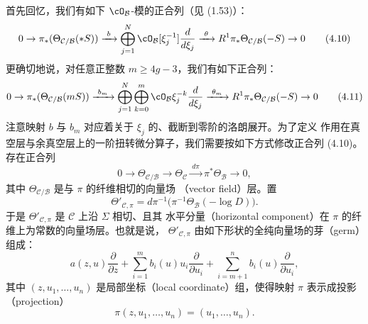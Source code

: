 首先回忆，我们有如下 $\cO_\mathcal{B}$-模的正合列（见 (1.53)）：
\begin{equation}
  0\to\pi_*(\Theta_{\mathcal{C}/\mathcal{B}}(*S))
  \xrightarrow{\ b\ }\bigoplus_{j=1}^N\cO_\mathcal{B}[\xi_j^{-1}]
  \frac{d}{d\xi_j}
  \xrightarrow{\ \theta\ }R^1\pi_*\Theta_{\mathcal{C}/\mathcal{B}}(-S)
  \to 0 \tag{4.10}
\end{equation}
更确切地说，对任意正整数 $m\ge 4g-3$，我们有如下正合列：
\begin{equation}
  0\to\pi_*(\Theta_{\mathcal{C}/\mathcal{B}}(mS))
  \xrightarrow{\ b_m\ }\bigoplus_{j=1}^N\bigoplus_{k=0}^m
  \cO_\mathcal{B}\xi_j^{-k}\frac{d}{d\xi_j}
  \xrightarrow{\ \theta_m\ }R^1\pi_*\Theta_{\mathcal{C}/\mathcal{B}}(-S)
  \to 0 \tag{4.11}
\end{equation}
注意映射 $b$ 与 $b_m$ 对应着关于 $\xi_j$ 的、截断到零阶的洛朗展开。为了定义
作用在真空层与余真空层上的一阶扭转微分算子，我们需要按如下方式修改正合列
(4.10)。
存在正合列
\[
  0\to\Theta_{\mathcal{C}/\mathcal{B}}\to\Theta_\mathcal{C}
  \xrightarrow{\ d\pi\ }\pi^*\Theta_\mathcal{B}\to 0 ,
\]
其中 $\Theta_{\mathcal{C}/\mathcal{B}}$ 是与 $\pi$ 的纤维相切的向量场
（vector field）层。置
\[
  \Theta'_{\mathcal{C},\pi}
  = d\pi^{-1}\bigl(\pi^{-1}\Theta_\mathcal{B}(-\log D)\bigr) .
\]
于是 $\Theta'_{\mathcal{C},\pi}$ 是 $\mathcal{C}$ 上沿 $\Sigma$ 相切、且其
水平分量（horizontal component）在 $\pi$ 的纤维上为常数的向量场层。也就是说，
$\Theta'_{\mathcal{C},\pi}$ 由如下形状的全纯向量场的芽（germ）组成：
\[
  a(z,u)\frac{\partial}{\partial z}
  +\sum_{i=1}^mb_i(u)u_i\frac{\partial}{\partial u_i}
  +\sum_{i=m+1}^nb_i(u)\frac{\partial}{\partial u_i},
\]
其中 $(z,u_1,\dots,u_n)$ 是局部坐标（local coordinate）组，使得映射 $\pi$
表示成投影（projection）
\[
  \pi(z,u_1,\dots,u_n)=(u_1,\dots,u_n) .
\]

